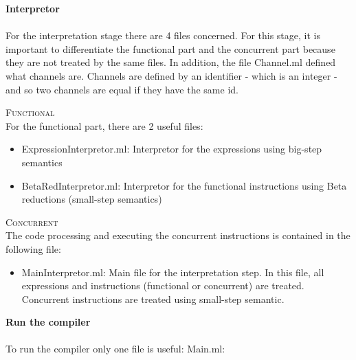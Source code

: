 \documentclass[11pt]{report}
\begin{document}
{} 
\tabto{0cm} {\LARGE \textbf{Interpretor}}
\\ \\
For the interpretation stage there are 4 files concerned. For this stage, it is important to differentiate the functional part and the concurrent part because they are not treated by the same files. In addition, the file Channel.ml defined what channels are. Channels are defined by an identifier - which is an integer - and so two channels are equal if they have the same id.
\vspace*{10pt}
{}
\tabto{1cm} {\Large \textsc{Functional}}
\\
For the functional part, there are 2 useful files:
\begin{itemize}
\item ExpressionInterpretor.ml: Interpretor for the expressions using big-step semantics
\item BetaRedInterpretor.ml: Interpretor for the functional instructions using Beta reductions (small-step semantics)
\end{itemize}

{} 
\tabto{1cm} {\Large \textsc{Concurrent}}
\\
The code processing and executing the concurrent instructions is contained in the following file:
\begin{itemize}
\item MainInterpretor.ml: Main file for the interpretation step. In this file, all expressions and instructions (functional or concurrent) are treated. Concurrent instructions are treated using small-step semantic.
\end{itemize}


{}
\tabto{0cm} {\LARGE \textbf{Run the compiler}}
\\ \\
To run the compiler only one file is useful: Main.ml: \\ 
\end{document}
